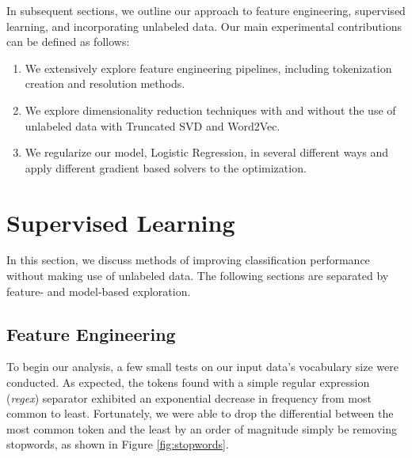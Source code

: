 \documentclass[11pt,a4paper]{article}
\begin{document}
In subsequent sections, we outline our approach to feature engineering, supervised learning, and incorporating unlabeled data. Our main experimental contributions can be defined as follows:
\begin{enumerate}
  \vspace{-2mm}
  \item We extensively explore feature engineering pipelines, including tokenization creation and resolution methods.
  \vspace{-2mm}
    \item We explore dimensionality reduction techniques with and without the use of unlabeled data with Truncated SVD and Word2Vec.
  \vspace{-2mm}
      \item We regularize our model, Logistic Regression, in several different ways and apply different gradient based solvers to the optimization.
  \vspace{-2mm}
\end{enumerate}




\section{Supervised Learning}%
\label{sec:supervised_learning}

In this section, we discuss methods of improving classification performance without making use of unlabeled data. The following sections are separated by feature- and model-based exploration.


\subsection{Feature Engineering}%
\label{sub:feature_engineering}

To begin our analysis, a few small tests on our input data's vocabulary size were conducted. As expected, the tokens found with a simple regular expression (\textit{regex}) separator exhibited an exponential decrease in frequency from most common to least. Fortunately, we were able to drop the differential between the most common token and the least by an order of magnitude simply be removing stopwords, as shown in Figure \ref{fig:stopwords}.
\end{document}
